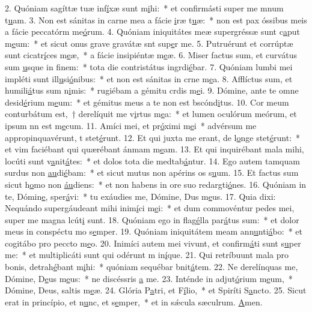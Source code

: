2. Quóniam sagíttæ tuæ inf\uline{í}xæ sunt m\uline{i}hi:~* et confirmásti super me mnum t\uline{u}am.
3. Non est sánitas in carne mea a fácie \uline{i}ræ t\uline{u}æ:~* non est pax óssibus meis a fácie peccatórm me\uline{ó}rum.
4. Quóniam iniquitátes meæ supergréssæ sunt c\uline{a}put m\uline{e}um:~* et sicut onus grave gravátæ snt sup\uline{e}r me.
5. Putruérunt et corrúptæ sunt cicatr\uline{í}ces m\uline{e}æ,~* a fácie insipiéntæ m\uline{e}æ.
6. Miser factus sum, et curvátus sum \uline{u}sque in f\uline{i}nem:~* tota die contristátus ingrdi\uline{é}bar.
7. Quóniam lumbi mei impléti sunt ill\uline{u}si\uline{ó}nibus:~* et non est sánitas in crne m\uline{e}a.
8. Afflíctus sum, et humili\uline{á}tus sum n\uline{i}mis:~* rugiébam a gémitu crdis m\uline{e}i.
9. Dómine, ante te omne desid\uline{é}rium m\uline{e}um:~* et gémitus meus a te non est bscónd\uline{i}tus.
10. Cor meum conturbátum est,~† derelíquit me v\uline{i}rtus m\uline{e}a:~* et lumen oculórum meórum, et ipsum nn est m\uline{e}cum.
11. Amíci mei, et pr\uline{ó}ximi m\uline{e}i~* advérsum me appropinquavérunt, t stet\uline{é}runt.
12. Et qui juxta me erant, de l\uline{o}nge stet\uline{é}runt:~* et vim faciébant qui quærébant ánmam m\uline{e}am.
13. Et qui inquirébant mala mihi, locúti sunt v\uline{a}nit\uline{á}tes:~* et dolos tota die medtab\uline{á}ntur.
14. Ego autem tamquam surdus non \uline{au}di\uline{é}bam:~* et sicut mutus non apérins os s\uline{u}um.
15. Et factus sum sicut h\uline{o}mo non \uline{áu}diens:~* et non habens in ore suo redargti\uline{ó}nes.
16. Quóniam in te, Dómin\uline{e}, sper\uline{á}vi:~* tu exáudies me, Dómine, Dus m\uline{e}us.
17. Quia dixi: Nequándo supergáudeant mihi inim\uline{í}ci m\uline{e}i:~* et dum commovéntur pedes mei, super me magna lcút\uline{i} sunt.
18. Quóniam ego in flag\uline{é}lla par\uline{á}tus sum:~* et dolor meus in conspéctu mo s\uline{e}mper.
19. Quóniam iniquitátem meam ann\uline{u}nti\uline{á}bo:~* et cogitábo pro peccto m\uline{e}o.
20. Inimíci autem mei vivunt, et confirm\uline{á}ti sunt s\uline{u}per me:~* et multiplicáti sunt qui odérunt m in\uline{í}que.
21. Qui retríbuunt mala pro bonis, detrah\uline{é}bant m\uline{i}hi:~* quóniam sequébar bnit\uline{á}tem.
22. Ne derelínquas me, Dómine, D\uline{e}us m\uline{e}us:~* ne discéssris \uline{a} me.
23. Inténde in adjut\uline{ó}rium m\uline{e}um,~* Dómine, Deus, saltis m\uline{e}æ.
24. Glória P\uline{a}tri, et F\uline{í}lio,~* et Spiríti S\uline{a}ncto.
25. Sicut erat in princípio, et n\uline{u}nc, et s\uline{e}mper,~* et in sǽcula sæculrum. \uline{A}men.
